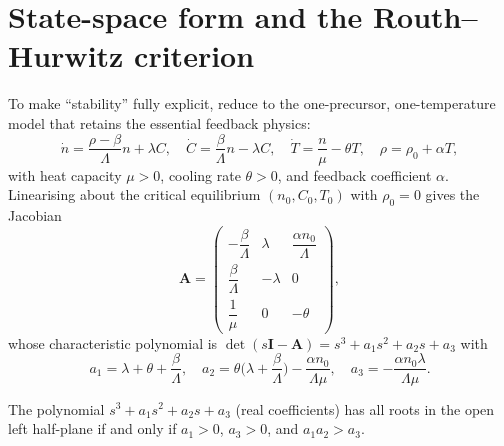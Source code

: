 


\section{State-space form and the Routh--Hurwitz criterion}
\label{sec:statespace}

To make ``stability'' fully explicit, reduce to the one-precursor,
one-temperature model that retains the essential feedback physics:
\begin{equation}
\dot n=\frac{\rho-\beta}{\Lambda}n+\lambda C,\quad
\dot C=\frac{\beta}{\Lambda}n-\lambda C,\quad
\dot T=\frac{n}{\mu}-\theta T,\quad \rho=\rho_0+\alpha T,
\end{equation}
with heat capacity $\mu>0$, cooling rate $\theta>0$, and feedback coefficient
$\alpha$. Linearising about the critical equilibrium $(n_0,C_0,T_0)$ with
$\rho_0=0$ gives the Jacobian
\begin{equation}
\mathbf A=
\begin{pmatrix}
-\dfrac{\beta}{\Lambda} & \lambda & \dfrac{\alpha n_0}{\Lambda}\\[5pt]
\dfrac{\beta}{\Lambda} & -\lambda & 0\\[5pt]
\dfrac{1}{\mu} & 0 & -\theta
\end{pmatrix},
\end{equation}
whose characteristic polynomial is $\det(s\mathbf I-\mathbf A)=s^3+a_1s^2+a_2s+a_3$
with
\begin{equation}
a_1=\lambda+\theta+\frac{\beta}{\Lambda},\quad
a_2=\theta\Big(\lambda+\frac{\beta}{\Lambda}\Big)-\frac{\alpha n_0}{\Lambda\mu},\quad
a_3=-\frac{\alpha n_0\lambda}{\Lambda\mu}.
\label{eq:rh-coeffs}
\end{equation}

\begin{theorem}
\label{thm:rh}
The polynomial $s^3+a_1s^2+a_2s+a_3$ (real coefficients) has all roots in the open
left half-plane if and only if $a_1>0$, $a_3>0$, and $a_1a_2>a_3$.
\end{theorem}

